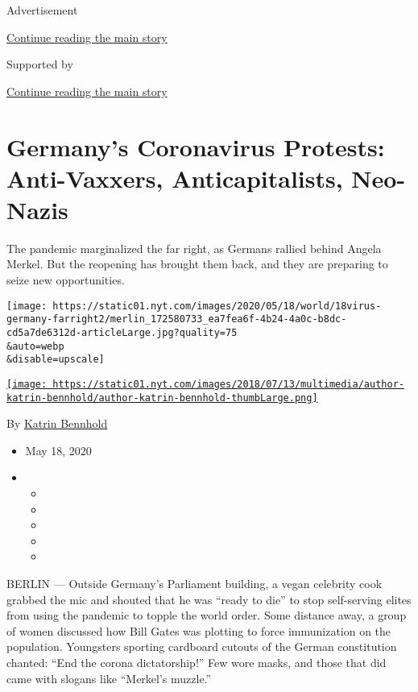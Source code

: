 Advertisement

\protect\hyperlink{after-top}{Continue reading the main story}

Supported by

\protect\hyperlink{after-sponsor}{Continue reading the main story}

\hypertarget{germanys-coronavirus-protests-anti-vaxxers-anticapitalists-neo-nazis}{%
\section{Germany's Coronavirus Protests: Anti-Vaxxers, Anticapitalists,
Neo-Nazis}\label{germanys-coronavirus-protests-anti-vaxxers-anticapitalists-neo-nazis}}

The pandemic marginalized the far right, as Germans rallied behind
Angela Merkel. But the reopening has brought them back, and they are
preparing to seize new opportunities.

\texttt{[image: https://static01.nyt.com/images/2020/05/18/world/18virus-germany-farright2/merlin\_172580733\_ea7fea6f-4b24-4a0c-b8dc-cd5a7de6312d-articleLarge.jpg?quality=75\\\&auto=webp\\\&disable=upscale]}

\href{https://www.nytimes.com/by/katrin-bennhold}{\texttt{[image: https://static01.nyt.com/images/2018/07/13/multimedia/author-katrin-bennhold/author-katrin-bennhold-thumbLarge.png]}}

By \href{https://www.nytimes.com/by/katrin-bennhold}{Katrin Bennhold}

\begin{itemize}
\item
  May 18, 2020
\item
  \begin{itemize}
  \item
  \item
  \item
  \item
  \item
  \end{itemize}
\end{itemize}

BERLIN --- Outside Germany's Parliament building, a vegan celebrity cook
grabbed the mic and shouted that he was ``ready to die'' to stop
self-serving elites from using the pandemic to topple the world order.
Some distance away, a group of women discussed how Bill Gates was
plotting to force immunization on the population. Youngsters sporting
cardboard cutouts of the German constitution chanted: ``End the corona
dictatorship!'' Few wore masks, and those that did came with slogans
like ``Merkel's muzzle.''

